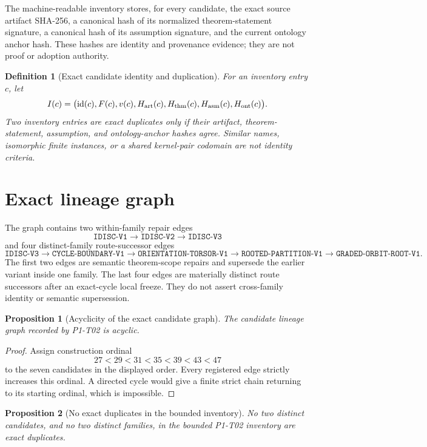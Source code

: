 \documentclass[11pt]{article}
\newtheorem{definition}{Definition}
\newtheorem{proposition}{Proposition}
\begin{document}
The machine-readable inventory stores, for every candidate, the exact source
artifact SHA-256, a canonical hash of its normalized theorem-statement
signature, a canonical hash of its assumption signature, and the current
ontology anchor hash. These hashes are identity and provenance evidence; they
are not proof or adoption authority.

\begin{definition}[Exact candidate identity and duplication]
For an inventory entry $c$, let
\[
 I(c)=\bigl(\operatorname{id}(c),F(c),v(c),H_{\rm art}(c),
 H_{\rm thm}(c),H_{\rm asm}(c),H_{\rm ont}(c)\bigr).
\]
Two inventory entries are \emph{exact duplicates} only if their artifact,
theorem-statement, assumption, and ontology-anchor hashes agree. Similar
names, isomorphic finite instances, or a shared kernel-pair codomain are not
identity criteria.
\end{definition}

\section{Exact lineage graph}

The graph contains two within-family repair edges
\[
 \texttt{IDISC-V1}\longrightarrow\texttt{IDISC-V2}
 \longrightarrow\texttt{IDISC-V3}
\]
and four distinct-family route-successor edges
\[
 \texttt{IDISC-V3}\longrightarrow\texttt{CYCLE-BOUNDARY-V1}
 \longrightarrow\texttt{ORIENTATION-TORSOR-V1}
 \longrightarrow\texttt{ROOTED-PARTITION-V1}
 \longrightarrow\texttt{GRADED-ORBIT-ROOT-V1}.
\]
The first two edges are semantic theorem-scope repairs and supersede the
earlier variant inside one family. The last four edges are materially
distinct route successors after an exact-cycle local freeze. They do not
assert cross-family identity or semantic supersession.

\begin{proposition}[Acyclicity of the exact candidate graph]
The candidate lineage graph recorded by P1-T02 is acyclic.
\end{proposition}

\begin{proof}
Assign construction ordinal
\[
 27<29<31<35<39<43<47
\]
to the seven candidates in the displayed order. Every registered edge
strictly increases this ordinal. A directed cycle would give a finite strict
chain returning to its starting ordinal, which is impossible.
\end{proof}

\begin{proposition}[No exact duplicates in the bounded inventory]
No two distinct candidates, and no two distinct families, in the bounded
P1-T02 inventory are exact duplicates.
\end{proposition}
\end{document}
